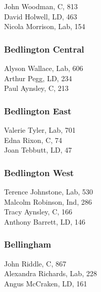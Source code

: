 \documentclass[a4paper,openany,10pt]{book}
\begin{document}


John Woodman, C, 813\\
David Holwell, LD, 463\\
Nicola Morrison, Lab, 154\\


\subsubsection*{Bedlington Central}



Alyson Wallace, Lab, 606\\
Arthur Pegg, LD, 234\\
Paul Aynsley, C, 213\\


\subsubsection*{Bedlington East}



Valerie Tyler, Lab, 701\\
Edna Rixon, C, 74\\
Joan Tebbutt, LD, 47\\


\subsubsection*{Bedlington West}



Terence Johnstone, Lab, 530\\
Malcolm Robinson, Ind, 286\\
Tracy Aynsley, C, 166\\
Anthony Barrett, LD, 146\\


\subsubsection*{Bellingham}



John Riddle, C, 867\\
Alexandra Richards, Lab, 228\\
Angus McCraken, LD, 161\\
\end{document}
